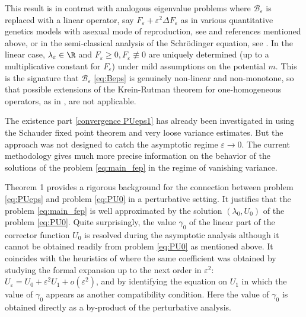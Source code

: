 \documentclass[10pt]{amsart}
\let\mathcal\mathscr
\newcommand{\cB}{\mathcal{B}}
\theoremstyle{plain}
\theoremstyle{definition}
\let\eps\varepsilon
\begin{document}
This result is in contrast with analogous eigenvalue problems where $\cB_\eps$ is replaced with a linear operator, say $F_\eps + \eps^2 \Delta F_\eps$ as in various quantitative genetics models with asexual mode of reproduction, see \eg \cite{mirrahimiconcentration} and references mentioned above, or in the semi-classical analysis of the Schrödinger equation, see \eg \cite{Sjostrand}. In the linear case, $\lambda_\eps\in \R$ and $F_\eps\geq 0, F_\eps\not\equiv 0$ are uniquely determined (up to a multiplicative constant for $F_\eps$) under mild assumptions on the potential $m$. This is the signature that $\cB_\eps$ \eqref{eq:Beps} is genuinely non-linear and non-monotone, so that possible extensions of the Krein-Rutman theorem for one-homogeneous operators, as in \cite{nonlinearkreinrutman}, are not applicable.

The existence part \eqref{convergence PUeps1} has already been investigated in \cite{bourgeronspec} using the Schauder fixed point theorem and very loose variance estimates. But the approach was not designed to catch the asymptotic regime $\eps\to 0$.
The current methodology gives much more precise information on the behavior of the solutions of the problem \eqref{eq:main_fep} in the regime of vanishing variance.

Theorem 1 provides a rigorous background for the connection between problem \eqref{eq:PUeps} and problem \eqref{eq:PU0} in a perturbative setting. It justifies that the problem \eqref{eq:main_fep} is well approximated by the solution $(\lambda_0,U_0)$ of the problem \eqref{eq:PU0}. Quite surprisingly, the value $\gamma_0$ of the linear part of the corrector function
$U_0$ is resolved during the asymptotic analysis although it cannot be obtained readily from problem \eqref{eq:PU0} as mentioned above. It coincides with the heuristics of \cite{main} where the same coefficient was obtained by studying the formal expansion up to the next order in $\eps^2$: $U_\eps = U_0 + \eps^2 U_1 + o(\eps^2)$, and by identifying the equation on $U_1$ in which the value of $\gamma_0$ appears as another compatibility condition. Here the value of $\gamma_0$ is obtained directly as a by-product of the perturbative analysis.
\end{document}
